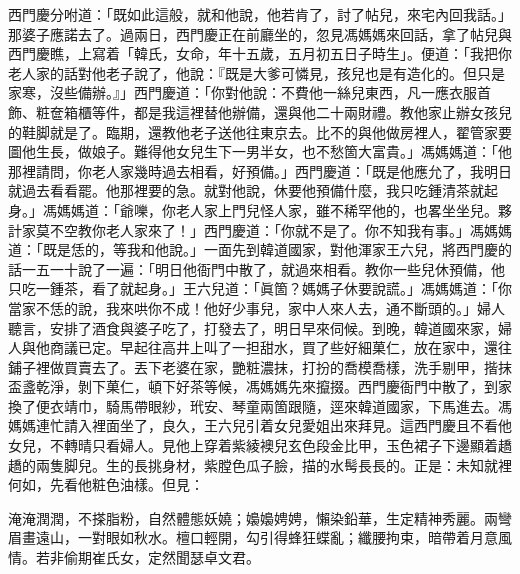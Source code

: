 西門慶分咐道：「既如此這般，就和他說，他若肯了，討了帖兒，來宅內回我話。」那婆子應諾去了。過兩日，西門慶正在前廳坐的，忽見馮媽媽來回話，拿了帖兒與西門慶瞧，上寫着「韓氏，女命，年十五歲，五月初五日子時生」。便道：「我把你老人家的話對他老子說了，他說：『既是大爹可憐見，孩兒也是有造化的。但只是家寒，沒些備辦。』」西門慶道：「你對他說：不費他一絲兒東西，凡一應衣服首飾、粧奩箱櫃等件，都是我這裡替他辦備，還與他二十兩財禮。教他家止辦女孩兒的鞋脚就是了。臨期，還教他老子送他往東京去。比不的與他做房裡人，翟管家要圖他生長，做娘子。難得他女兒生下一男半女，也不愁箇大富貴。」馮媽媽道：「他那裡請問，你老人家幾時過去相看，好預備。」西門慶道：「既是他應允了，我明日就過去看看罷。他那裡要的急。就對他說，休要他預備什麼，我只吃鍾清茶就起身。」馮媽媽道：「爺嚛，你老人家上門兒怪人家，雖不稀罕他的，也畧坐坐兒。夥計家莫不空教你老人家來了！」西門慶道：「你就不是了。你不知我有事。」馮媽媽道：「既是恁的，等我和他說。」一面先到韓道國家，對他渾家王六兒，將西門慶的話一五一十說了一遍：「明日他衙門中散了，就過來相看。教你一些兒休預備，他只吃一鍾茶，看了就起身。」王六兒道：「眞箇？媽媽子休要說謊。」馮媽媽道：「你當家{}不恁的說，我來哄你不成！他好少事兒，家中人來人去，通不斷頭的。」婦人聽言，安排了酒食與婆子吃了，打發去了，明日早來伺候。到晚，韓道國來家，婦人與他商議已定。早起往高井上叫了一担甜水，買了些好細菓仁，放在家中，還往鋪子裡做買賣去了。丟下老婆在家，{}艷粧濃抹，打扮的喬模喬樣，洗手剔甲，揩抹盃盞乾淨，剝下菓仁，頓下好茶等候，馮媽媽先來攛掇。西門慶衙門中散了，到家換了便衣靖巾，騎馬帶眼紗，玳安、琴童兩箇跟隨，逕來韓道國家，下馬進去。馮媽媽連忙請入裡面坐了，良久，王六兒引着女兒愛姐出來拜見。這西門慶且不看他女兒，不轉晴只看婦人。見他上穿着紫綾襖兒玄色段金比甲，玉色裙子下邊顯着趫趫的兩隻脚兒。生的長挑身材，紫膛色瓜子臉，描的水髩長長的。{}正是：未知就裡何如，先看他粧色油樣。但見：

\begin{myquote}
淹淹潤潤，不搽脂粉，自然體態妖嬈；嬝嬝娉娉，懶染鉛華，生定精神秀麗。兩彎眉畫遠山，一對眼如秋水。檀口輕開，勾引得蜂狂蝶亂；纖腰拘束，暗帶着月意風情。若非偷期崔氏女，定然聞瑟卓文君。
\end{myquote}

